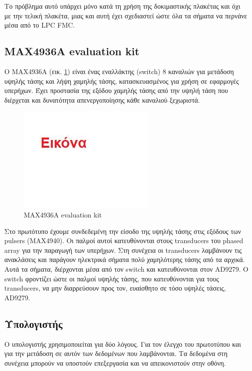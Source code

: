 \documentclass[12pt,a4paper]{book}
\begin{document}
Το πρόβλημα αυτό υπάρχει μόνο κατά τη χρήση της δοκιμαστικής πλακέτας και όχι με την τελική πλακέτα, μιας και αυτή έχει σχεδιαστεί ώστε όλα τα σήματα να περνάνε μέσα από το LPC FMC.


\subsection{MAX4936A evaluation kit}
Ο MAX4936A (εικ. \ref{max4936}) είναι ένας εναλλάκτης (switch) 8 καναλιών για μετάδοση υψηλής τάσης και λήψη χαμηλής τάσης, κατασκευασμένος για χρήση σε εφαρμογές υπερήχων. Έχει προστασία της εξόδου χαμηλής τάσης από την υψηλή τάση που διέρχεται και δυνατότητα απενεργοποίησης κάθε καναλιού ξεχωριστά.
\begin{figure}
	\centering
	\includegraphics[width=\textwidth]{myimage}
	\caption{MAX4936A evaluation kit}
	\label{max4936}
\end{figure}

Στο πρωτότυπο έχουμε συνδεδεμένη την είσοδο της υψηλής τάσης στις εξόδους των pulsers (MAX4940). Οι παλμοί αυτοί κατευθύνονται στους transducers του phased array για την παραγωγή των υπερήχων. Στη συνέχεια οι transducers λαμβάνουν τις ανακλάσεις και παράγουν ηλεκτρικά σήματα πολύ χαμηλότερης τάσης από τα αρχικά. Αυτά τα σήματα, διέρχονται μέσα από τον switch και κατευθύνονται στον AD9279. Ο switch φροντίζει ώστε οι παλμοί υψηλής τάσης, που κατευθύνονται για τους transducers, να μην διαρρεύσουν προς τον, ευαίσθητο σε τόσο υψηλές τάσεις, AD9279. 




\subsection{Υπολογιστής}
Ο υπολογιστής χρησιμοποιείται για δύο λόγους. Για τον έλεγχο του πρωτοτύπου και για την μετάδοση σε αυτόν των δεδομένων που λαμβάνονται. Τα δεδομένα στη συνέχεια μπορούν να υποστούν επεξεργασία και να απεικονιστούν στην οθόνη. 
\end{document}
